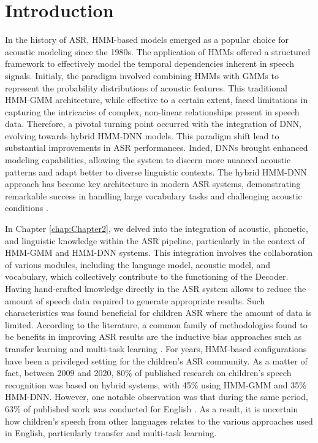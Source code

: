 \label{chap:Chapter3}
\cleardoublepage
\section{Introduction}

In the history of \ac{ASR}, HMM-based models emerged as a popular choice for acoustic modeling since the 1980s. The application of \acp{HMM} offered a structured framework to effectively model the temporal dependencies inherent in speech signals. Initialy, the paradigm involved combining \acp{HMM} with \acp{GMM} to represent the probability distributions of acoustic features. This traditional \ac{HMM-GMM} architecture, while effective to a certain extent, faced limitations in capturing the intricacies of complex, non-linear relationships present in speech data. Therefore, a pivotal turning point occurred with the integration of \ac{DNN}, evolving towards hybrid \ac{HMM-DNN} models. This paradigm shift lead to substantial improvements in \ac{ASR} performances. Inded, \acp{DNN} brought enhanced modeling capabilities, allowing the system to discern more nuanced acoustic patterns and adapt better to diverse linguistic contexts. The hybrid \ac{HMM-DNN} approach has become key architecture in modern \ac{ASR} systems, demonstrating remarkable success in handling large vocabulary tasks and challenging acoustic conditions \cite{hmm-dnn}. 

In Chapter \ref{chap:Chapter2}, we delved into the integration of acoustic, phonetic, and linguistic knowledge within the \ac{ASR} pipeline, particularly in the context of \ac{HMM-GMM} and \ac{HMM-DNN} systems. This integration involves the collaboration of various modules, including the language model, acoustic model, and vocabulary, which collectively contribute to the functioning of the Decoder. Having hand-crafted knowledge directly in the \ac{ASR} system allows to reduce the amount of speech data required to generate appropriate results. Such characteristics was found beneficial for children \ac{ASR} where the amount of data is limited. According to the literature, a common family of methodologies  found to be benefits in improving \ac{ASR} results are the inductive bias approaches such as transfer learning and multi-task learning \cite{TransferLF}. For years, HMM-based configurations have been a privileged setting for the children's \ac{ASR} community. As a matter of fact, between 2009 and 2020, 80\% of published research on children's speech recognition was based on hybrid systems, with 45\% using \ac{HMM-GMM} and 35\% \ac{HMM-DNN}. However, one notable observation was that during the same period, 63\% of published work was conducted for English \cite{big_review_childASR}. As a result, it is uncertain how children's speech from other languages relates to the various approaches used in English, particularly transfer and multi-task learning.

